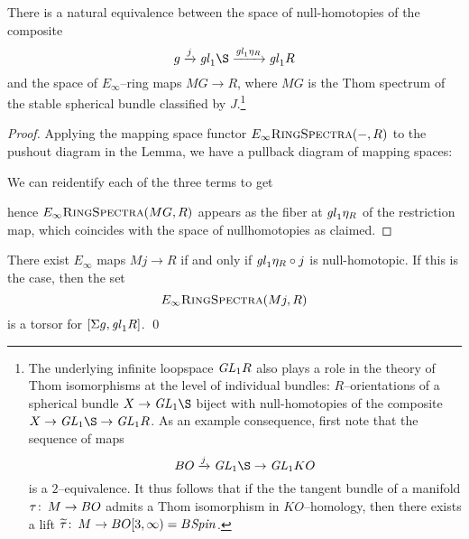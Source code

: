 \begin{corollary}
There is a natural equivalence between the space of null-homotopies of the composite \[g \xrightarrow j \gl_1 \S \xrightarrow{\gl_1 \eta_R} \gl_1 R\] and the space of \(E_\infty\)--ring maps \(MG \to R\), where \(MG\) is the Thom spectrum of the stable spherical bundle classified by \(J\).\footnote{The underlying infinite loopspace \(\mathit{GL}_1 R\) also plays a role in the theory of Thom isomorphisms at the level of individual bundles: \(R\)--orientations of a spherical bundle \(X \to \GL_1 \S\) biject with null-homotopies of the composite \(X \to \GL_1 \S \to \GL_1 R\).  As an example consequence, first note that the sequence of maps \[BO \xrightarrow{j} \GL_1 \S \to \GL_1 KO\] is a \(2\)--equivalence.  It thus follows that if the the tangent bundle of a manifold \(\tau\colon\thinspace M \to BO\) admits a Thom isomorphism in \(KO\)--homology, then there exists a lift \(\widetilde\tau\colon\thinspace M \to BO[3, \infty) = B\mathit{Spin}\).}
\end{corollary}
\begin{proof}
Applying the mapping space functor \(E_\infty\normalfont\textsc{RingSpectra}(-, R)\) to the pushout diagram in the Lemma, we have a pullback diagram of mapping spaces:
\begin{center}
\end{center}
We can reidentify each of the three terms to get
\begin{center}
\end{center}
hence \(E_\infty\normalfont\textsc{RingSpectra}(MG, R)\) appears as the fiber at \(\mathit{gl}_1 \eta_R\) of the restriction map, which coincides with the space of nullhomotopies as claimed.
\end{proof}

\begin{corollary}
There exist \(E_\infty\) maps \(Mj \to R\) if and only if \(\mathit{gl}_1 \eta_R \circ j\) is null-homotopic.  If this is the case, then the set \[E_\infty\normalfont\textsc{RingSpectra}(Mj, R)\] is a torsor for \([\Sigma g, \mathit{gl}_1 R]\). \qed
\end{corollary}

